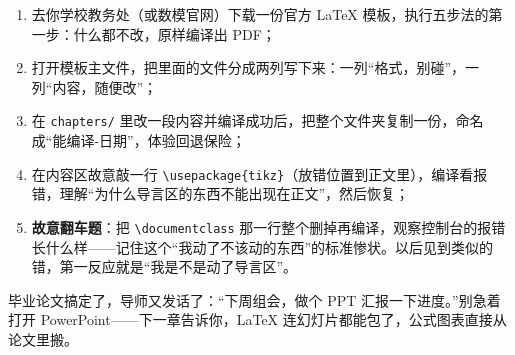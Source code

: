 \begin{enumerate}
\setlength{\itemsep}{2pt}
\item 去你学校教务处（或数模官网）下载一份官方 LaTeX 模板，执行五步法的第一步：什么都不改，原样编译出 PDF；
\item 打开模板主文件，把里面的文件分成两列写下来：一列“格式，别碰”，一列“内容，随便改”；
\item 在 \texttt{chapters/} 里改一段内容并编译成功后，把整个文件夹复制一份，命名成“能编译-日期”，体验回退保险；
\item 在内容区故意敲一行 \texttt{\textbackslash{}usepackage\{tikz\}}（放错位置到正文里），编译看报错，理解“为什么导言区的东西不能出现在正文”，然后恢复；
\item \textbf{故意翻车题}：把 \texttt{\textbackslash{}documentclass} 那一行整个删掉再编译，观察控制台的报错长什么样——记住这个“我动了不该动的东西”的标准惨状。以后见到类似的错，第一反应就是“我是不是动了导言区”。
\end{enumerate}

毕业论文搞定了，导师又发话了：“下周组会，做个 PPT 汇报一下进度。”别急着打开 PowerPoint——下一章告诉你，LaTeX 连幻灯片都能包了，公式图表直接从论文里搬。
